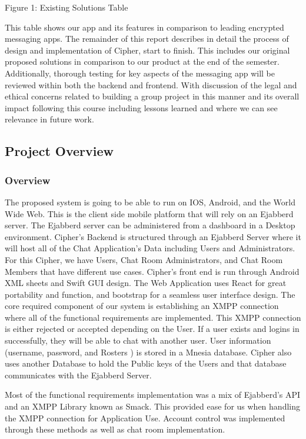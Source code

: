 \documentclass[12pt]{article}
\begin{document}
\centering Figure 1: Existing Solutions Table

This table shows our app and its features in comparison to leading encrypted messaging apps.
\vspace{0.5cm}
The remainder of this report describes in detail the process of design and implementation of Cipher, start to finish. This includes our original proposed solutions in comparison to our product at the end of the semester. Additionally, thorough testing for key aspects of the messaging app will be reviewed within both the backend and frontend. With discussion of the legal and ethical concerns related to building a group project in this manner and its overall impact following this course including lessons learned and where we can see relevance in future work.

\subsection{\RaggedRight Project Overview}
\subsubsection{Overview}
\RaggedRight The proposed system is going to be able to run on IOS, Android, and the World Wide Web. This is the client side mobile platform that will rely on an Ejabberd server. The Ejabberd server can be administered from a dashboard in a Desktop environment. Cipher’s Backend is structured through an Ejabberd Server where it will host all of the Chat Application’s Data including Users and Administrators. For this Cipher, we have Users, Chat Room Administrators, and  Chat Room Members that have different use cases. Cipher’s front end is run through Android XML sheets and Swift GUI design. The Web Application uses React for great portability and function, and bootstrap for a seamless user interface design. The core required component of our system is establishing an XMPP connection where all of the functional requirements are implemented. This XMPP connection is either rejected or accepted depending on the User. If a user exists and logins in successfully, they will be able to chat with another user. User information (username, password, and Rosters ) is stored in a Mnesia database. Cipher also uses another Database to hold the Public keys of the Users and that database communicates with the Ejabberd Server.

Most of the functional requirements implementation was a mix of Ejabberd’s API  and an XMPP Library known as Smack. This provided ease for us when handling the XMPP connection for Application Use. Account control was implemented through these methods as well as chat room implementation.
\end{document}
